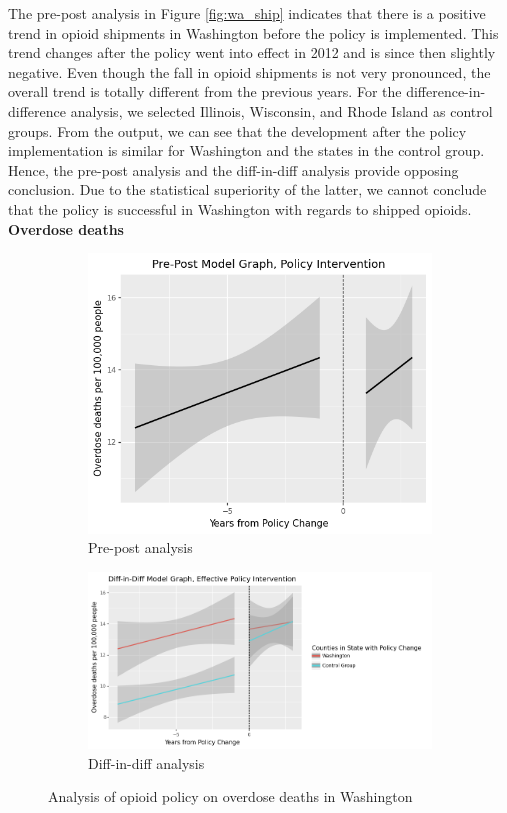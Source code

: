 \documentclass[12pt,letterpaper]{article}
\begin{document}
The pre-post analysis in Figure \ref{fig:wa_ship} indicates that there is a positive trend in opioid shipments in Washington before the policy is implemented. This trend changes after the policy went into effect in 2012 and is since then slightly negative. Even though the fall in opioid shipments is not very pronounced, the overall trend is totally different from the previous years. For the difference-in-difference analysis, we selected Illinois, Wisconsin, and Rhode Island as control groups. From the output, we can see that the development after the policy implementation is similar for Washington and the states in the control group. Hence, the pre-post analysis and the diff-in-diff analysis provide opposing conclusion. Due to the statistical superiority of the latter, we cannot conclude that the policy is successful in Washington with regards to shipped opioids. \\

\noindent \textbf{Overdose deaths}

\begin{figure}[!h]
\centering
\begin{subfigure}{.5\textwidth}
  \centering
  \includegraphics[width=0.7\linewidth]{../30_results/General_Results/washington_overdose_death_prepost.png}
  \caption{Pre-post analysis}
  \label{fig:wa_death_prepost}
\end{subfigure}%
\begin{subfigure}{.55\textwidth}
  \centering
  \includegraphics[width=1\linewidth]{../30_results/General_Results/washington_overdose_death_diffdiff.png}
  \caption{Diff-in-diff analysis}
  \label{fig:wa_death_did}
\end{subfigure}
\caption{Analysis of opioid policy on overdose deaths in Washington}
\label{fig:wa_death}
\end{figure}
\end{document}
